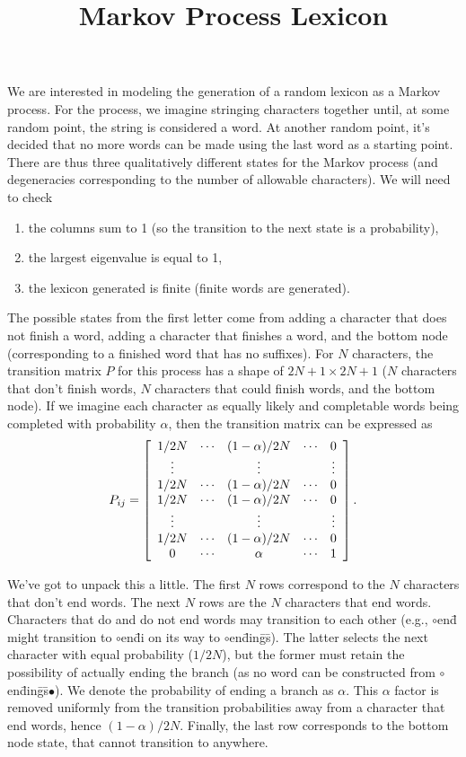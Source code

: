 \documentclass[11pt]{article}
\title{Markov Process Lexicon}
\begin{document}
\maketitle

We are interested in modeling the generation of a random lexicon as a Markov process. For the process, we imagine stringing characters together until, at some random point, the string is considered a word. At another random point, it's decided that no more words can be made using the last word as a starting point. There are thus three qualitatively different states for the Markov process (and degeneracies corresponding to the number of allowable characters). We will need to check
\begin{enumerate}
\item the columns sum to 1 (so the transition to the next state is a probability),
\item the largest eigenvalue is equal to 1,
\item the lexicon generated is finite (finite words are generated).
\end{enumerate}
The possible states from the first letter come from adding a character that does not finish a word, adding a character that finishes a word, and the bottom node (corresponding to a finished word that has no suffixes). For $N$ characters, the transition matrix $P$ for this process has a shape of $2N+1\times2N+1$ ($N$ characters that don't finish words, $N$ characters that could finish words, and the bottom node). If we imagine each character as equally likely and completable words being completed with probability $\alpha$, then the transition matrix can be expressed as
\begin{equation}
P_{ij}=\left[\begin{array}{c c c c c c}
1/2N&\cdots & (1-\alpha)/2N & \cdots & 0\\
 \vdots & & \vdots & & \vdots\\
1/2N & \cdots & (1-\alpha)/2N & \cdots & 0\\
1/2N & \cdots & (1-\alpha)/2N & \cdots & 0\\
\vdots & & \vdots & & \vdots\\
1/2N & \cdots & (1-\alpha)/2N & \cdots & 0\\
0 & \cdots & \alpha & \cdots & 1
\end{array}
\right].
\end{equation}

We've got to unpack this a little. The first $N$ rows correspond to the $N$ characters that don't end words. The next $N$ rows are the $N$ characters that end words. Characters that do and do not end words may transition to each other (e.g., $\circ$en\=d might transition to $\circ$en\=di on its way to $\circ$en\=din\=g\=s). The latter selects the next character with equal probability ($1/2N$), but the former must retain the possibility of actually ending the branch (as no word can be constructed from $\circ$en\=din\=g\=s$\bullet$). We denote the probability of ending a branch as $\alpha$. This $\alpha$ factor is removed uniformly from the transition probabilities away from a character that end words, hence $(1-\alpha)/2N$. Finally, the last row corresponds to the bottom node state, that cannot transition to anywhere.
\end{document}
